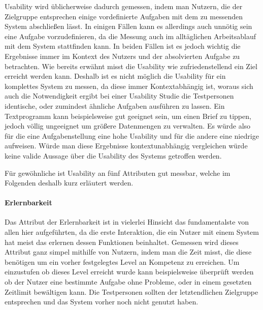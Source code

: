 Usability wird üblicherweise dadurch gemessen, indem man Nutzern, die der Zielgruppe entsprechen einige vordefinierte Aufgaben mit dem zu messenden System abschließen lässt. 
In einigen Fällen kann es allerdings auch unnötig sein eine Aufgabe vorzudefinieren, da die Messung auch im alltäglichen Arbeitsablauf mit dem System stattfinden kann.
In beiden Fällen ist es jedoch wichtig die Ergebnisse immer im Kontext des Nutzers und der absolvierten Aufgabe zu betrachten\cite{Nielsen.1995?}. 
Wie bereits erwähnt misst die Usability wie zufriedenstellend ein Ziel erreicht werden kann.
Deshalb ist es nicht möglich die Usability für ein komplettes System zu messen, da diese immer Kontextabhängig ist, woraus sich auch die Notwendigkeit ergibt bei einer Usability Studie die Testpersonen identische, oder zumindest ähnliche Aufgaben ausführen zu lassen.
Ein Textprogramm kann beispielsweise gut geeignet sein, um einen Brief zu tippen, jedoch völlig ungeeignet um größere Datenmengen zu verwalten. Es würde also für die eine Aufgabenstellung eine hohe Usability und für die andere eine niedrige aufweisen. 
Würde man diese Ergebnisse kontextunabhängig vergleichen würde keine valide Aussage über die Usability des Systems getroffen werden.

Für gewöhnliche ist Usability an fünf Attributen gut messbar, welche im Folgenden deshalb kurz erläutert werden.

\paragraph{Erlernbarkeit}
Das Attribut der Erlernbarkeit ist in vielerlei Hinsicht das fundamentalste von allen hier aufgeführten, da die erste Interaktion, die ein Nutzer mit einem System hat meist das erlernen dessen Funktionen beinhaltet.
Gemessen wird dieses Attribut ganz simpel mithilfe von Nutzern, indem man die Zeit misst, die diese benötigen um ein vorher festgelegtes Level an Kompetenz zu erreichen.
Um einzustufen ob dieses Level erreicht wurde kann beispielsweise überprüft werden ob der Nutzer eine bestimmte Aufgabe ohne Probleme, oder in einem gesetzten Zeitlimit bewältigen kann.
Die Testpersonen sollten der letztendlichen Zielgruppe entsprechen und das System vorher noch nicht genutzt haben\cite{Nielsen.1995?}.

